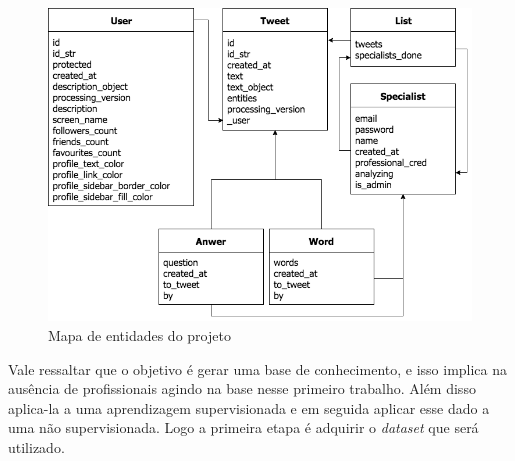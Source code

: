 \begin{figure}[!h]
    \centering
    \includegraphics[width=.65\textwidth]{imagens/entities.png}
    \caption{Mapa de entidades do projeto}
    \label{fig:entities}
\end{figure}

Vale ressaltar que o objetivo é gerar uma base de conhecimento, e isso implica na ausência de profissionais agindo na base nesse primeiro trabalho. Além disso aplica-la a uma aprendizagem supervisionada e em seguida aplicar esse dado a uma não supervisionada. Logo a primeira etapa é adquirir o \textit{dataset} que será utilizado.





